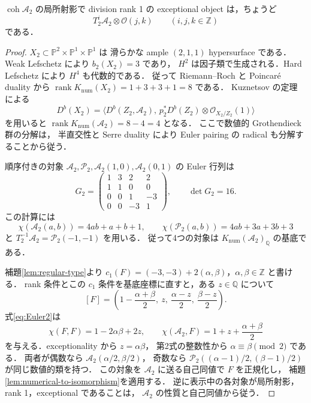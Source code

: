 \begin{proposition}
\label{prop:classification2}
$\operatorname{coh}\mathcal A_2$ の局所射影で division rank 1 の
exceptional object は，ちょうど
\[
 T_2^i\mathcal A_2\otimes\mathcal O(j,k)
 \qquad (i,j,k\in\mathbb Z)
\]
である．
\end{proposition}
\begin{proof}
$X_2\subset\mathbb P^2\times\mathbb P^1\times\mathbb P^1$ は
滑らかな ample $(2,1,1)$ hypersurface である．
Weak Lefschetz により $b_2(X_2)=3$ であり，
$H^2$ は因子類で生成される．Hard Lefschetz により $H^4$ も代数的である．
従って Riemann--Roch と Poincar\'e duality から
$\operatorname{rank}K_{\mathrm{num}}(X_2)=1+3+3+1=8$ である．
Kuznetsov の定理 \cite[Theorem~4.2]{KuznetsovQuadric} による
\[
 D^b(X_2)=\langle D^b(Z_2,\mathcal A_2),\,
 p_2^*D^b(Z_2)\otimes\mathcal O_{X_2/Z_2}(1)\rangle
\]
を用いると
$\operatorname{rank}K_{\mathrm{num}}(\mathcal A_2)=8-4=4$ となる．
ここで数値的 Grothendieck 群の分解は，
半直交性と Serre duality により Euler pairing の radical も分解することから従う．

順序付きの対象
$\mathcal A_2,\mathcal P_2,\mathcal A_2(1,0),\mathcal A_2(0,1)$ の
Euler 行列は
\begin{equation}
 G_2=
 \begin{pmatrix}
 1&3&2&2\\1&1&0&0\\0&0&1&-3\\0&0&-3&1
 \end{pmatrix},\qquad\det G_2=16.
 \label{eq:Euler2}
\end{equation}
この計算には
\[
 \chi(\mathcal A_2(a,b))=4ab+a+b+1,\qquad
 \chi(\mathcal P_2(a,b))=4ab+3a+3b+3
\]
と $T_2^{-1}\mathcal A_2=\mathcal P_2(-1,-1)$ を用いる．
従って4つの対象は $K_{\mathrm{num}}(\mathcal A_2)_{\mathbb Q}$ の基底である．

補題\ref{lem:regular-type}より
$c_1(F)=(-3,-3)+2(\alpha,\beta)$，$\alpha,\beta\in\mathbb Z$ と書ける．
rank 条件とこの $c_1$ 条件を基底座標に直すと，ある $z\in\mathbb Q$ について
\[
 [F]=
 \left(1-\frac{\alpha+\beta}{2},\
 z,\ \frac{\alpha-z}{2},\ \frac{\beta-z}{2}\right).
\]
式\eqref{eq:Euler2}は
\[
 \chi(F,F)=1-2\alpha\beta+2z,\qquad
 \chi(\mathcal A_2,F)=1+z+\frac{\alpha+\beta}{2}
\]
を与える．exceptionality から $z=\alpha\beta$，
第2式の整数性から $\alpha\equiv\beta\pmod2$ である．
両者が偶数なら $\mathcal A_2(\alpha/2,\beta/2)$，
奇数なら $\mathcal P_2((\alpha-1)/2,(\beta-1)/2)$ が同じ数値的類を持つ．
この対象を $\mathcal A_2$ に送る自己同値で $F$ を正規化し，
補題\ref{lem:numerical-to-isomorphism}を適用する．
逆に表示中の各対象が局所射影，rank 1，exceptional であることは，
$\mathcal A_2$ の性質と自己同値から従う．
\end{proof}

